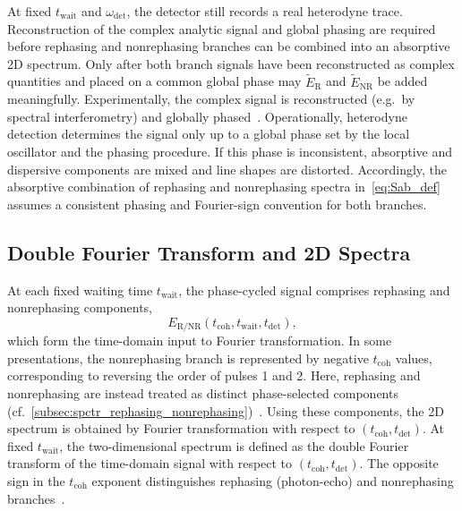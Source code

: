At fixed $t_{\mathrm{wait}}$ and $\omega_{\mathrm{det}}$, the detector still records a real heterodyne trace. Reconstruction of the complex analytic signal and global phasing are required before rephasing and nonrephasing branches can be combined into an absorptive 2D spectrum. Only after both branch signals have been reconstructed as complex quantities and placed on a common global phase may $\tilde{E}_{\mathrm{R}}$ and $\tilde{E}_{\mathrm{NR}}$ be added meaningfully.
Experimentally, the complex signal is reconstructed (e.g.\ by spectral interferometry) and globally phased~\cite{cho2009twodimensionalopticalspectroscopy,hybletal1998twodimensionalelectronicspectroscopy}.
Operationally, heterodyne detection determines the signal only up to a global phase set by the local oscillator and the phasing procedure.
If this phase is inconsistent, absorptive and dispersive components are mixed and line shapes are distorted.
Accordingly, the absorptive combination of rephasing and nonrephasing spectra in~\autoref{eq:Sab_def} assumes a consistent phasing and Fourier-sign convention for both branches.

\subsection{Double Fourier Transform and 2D Spectra}
At each fixed waiting time $t_{\mathrm{wait}}$, the phase-cycled signal comprises rephasing and nonrephasing components,
\begin{equation}
	E_{\mathrm{R/NR}}(t_{\mathrm{coh}},t_{\mathrm{wait}},t_{\mathrm{det}}),
\label{eq:time_domain_signal}
\end{equation}
which form the time-domain input to Fourier transformation.
In some presentations, the nonrephasing branch is represented by negative $t_{\mathrm{coh}}$ values, corresponding to reversing the order of pulses 1 and 2.
Here, rephasing and nonrephasing are instead treated as distinct phase-selected components (cf.~\autoref{subsec:spctr_rephasing_nonrephasing})~\cite{cho2009twodimensionalopticalspectroscopy,ginsbergetal2009twodimensionalelectronicspectroscopy}.
Using these components, the 2D spectrum is obtained by Fourier transformation with respect to $(t_{\mathrm{coh}},t_{\mathrm{det}})$.
At fixed $t_{\mathrm{wait}}$, the two-dimensional spectrum is defined as the double Fourier transform of the time-domain signal with respect to $(t_{\mathrm{coh}},t_{\mathrm{det}})$.
The opposite sign in the $t_{\mathrm{coh}}$ exponent distinguishes rephasing (photon-echo) and nonrephasing branches~\cite{cho2009twodimensionalopticalspectroscopy,greenetal2024vibrationalcoherenceshalfbroadband}.

